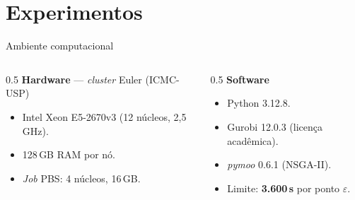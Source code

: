 \section{Experimentos}


\begin{frame}{Ambiente computacional}
    \begin{columns}[T]
        \begin{column}{0.5\textwidth}
            \textbf{Hardware} --- \textit{cluster} Euler (ICMC-USP)
            \begin{itemize}
                \item Intel Xeon E5-2670v3 (12 núcleos, 2,5\,GHz).
                \item 128\,GB RAM por nó.
                \item \textit{Job} PBS: 4 núcleos, 16\,GB.
            \end{itemize}
        \end{column}
        \begin{column}{0.5\textwidth}
            \textbf{Software}
            \begin{itemize}
                \item Python 3.12.8.
                \item Gurobi 12.0.3 (licença acadêmica).
                \item \textit{pymoo} 0.6.1 (NSGA-II).
                \item Limite: \textbf{3.600\,s} por ponto $\varepsilon$.
            \end{itemize}
        \end{column}
    \end{columns}
\end{frame}

